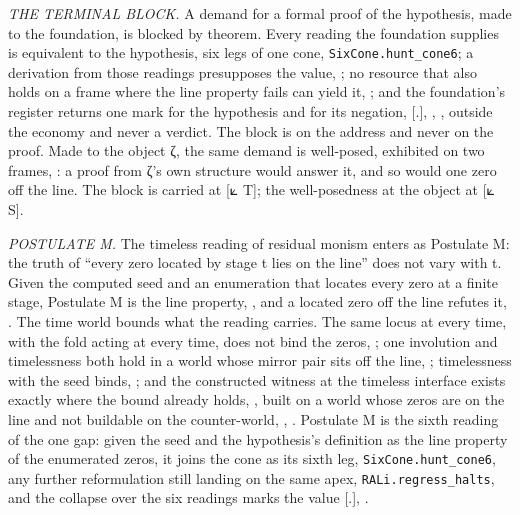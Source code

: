 \documentclass[10pt,twocolumn]{article}
\begin{document}
\emph{THE TERMINAL BLOCK.} A demand for a formal proof of the
hypothesis, made to the foundation, is blocked by theorem. Every reading
the foundation supplies is equivalent to the hypothesis, six legs of one
cone, \texttt{SixCone.hunt\_cone6}; a derivation from those readings
presupposes the value,
\texttt{}; no resource that also
holds on a frame where the line property fails can yield it,
\texttt{}; and the foundation's
register returns one mark for the hypothesis and for its negation,
{[}.{]}, \texttt{},
\texttt{}, outside the
economy and never a verdict. The block is on the address and never on
the proof. Made to the object ζ, the same demand is well-posed,
exhibited on two frames, \texttt{}: a
proof from ζ's own structure would answer it, and so would one zero off
the line. The block is carried at {[}⟀ T{]}; the well-posedness at the
object at {[}⟀ S{]}.

\emph{POSTULATE M.} The timeless reading of residual monism enters as
Postulate M: the truth of ``every zero located by stage t lies on the
line'' does not vary with t. Given the computed seed and an enumeration
that locates every zero at a finite stage, Postulate M is the line
property, \texttt{}, and a
located zero off the line refutes it,
\texttt{}. The time world bounds
what the reading carries. The same locus at every time, with the fold
acting at every time, does not bind the zeros,
\texttt{}; one involution and
timelessness both hold in a world whose mirror pair sits off the line,
\texttt{};
timelessness with the seed binds,
\texttt{}; and the
constructed witness at the timeless interface exists exactly where the
bound already holds, \texttt{},
built on a world whose zeros are on the line and not buildable on the
counter-world, \texttt{},
\texttt{}. Postulate M
is the sixth reading of the one gap: given the seed and the hypothesis's
definition as the line property of the enumerated zeros, it joins the
cone as its sixth leg, \texttt{SixCone.hunt\_cone6}, any further
reformulation still landing on the same apex,
\texttt{RALi.regress\_halts}, and the collapse over the six readings
marks the value {[}.{]}, \texttt{}.
\end{document}
